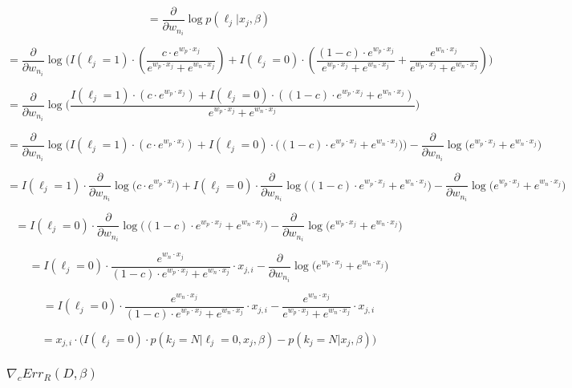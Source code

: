 \documentclass[]{article}
\begin{document}
$$
 = \frac{\partial}{\partial w_{n_i}}\log{p(\ell_j | x_j, \beta)}
$$

$$
 = \frac{\partial}{\partial w_{n_i}}
		\log{\Bigg(
			I(\ell_j=1) \cdot \left( \frac{c \cdot e^{w_p \cdot x_j}}{e^{w_p \cdot x_j} + e^{w_n \cdot x_j}} \right) + 
			I(\ell_j=0) \cdot \left(\frac{(1 - c) \cdot e^{w_p \cdot x_j}}{e^{w_p \cdot x_j} + e^{w_n \cdot x_j}}  + \frac{e^{w_n \cdot x_j}}{e^{w_p \cdot x_j} + e^{w_n \cdot x_j}} \right)
		\Bigg)}
$$

$$
 = \frac{\partial}{\partial w_{n_i}}
		\log{\Bigg(
		    \frac{
			I(\ell_j=1) \cdot \left( c \cdot e^{w_p \cdot x_j} \right) + 
			I(\ell_j=0) \cdot \left( (1 - c) \cdot e^{w_p \cdot x_j}  + e^{w_n \cdot x_j} \right)
		     }{e^{w_p \cdot x_j} + e^{w_n \cdot x_j}}
		\Bigg)}
$$

$$
 = \frac{\partial}{\partial w_{n_i}}
		\log{\bigg(
			I(\ell_j=1) \cdot \left( c \cdot e^{w_p \cdot x_j} \right) + 
			I(\ell_j=0) \cdot \Big( (1 - c) \cdot e^{w_p \cdot x_j}  + e^{w_n \cdot x_j} \Big)
		\bigg)}
		- \frac{\partial}{\partial w_{n_i}}
		 \log{\bigg(
			e^{w_p \cdot x_j} + e^{w_n \cdot x_j}
		\bigg)}
$$


$$
 = I(\ell_j=1) \cdot \frac{\partial}{\partial w_{n_i}}
		\log{\Big(
			c \cdot e^{w_p \cdot x_j}
		\Big)} +
    I(\ell_j=0) \cdot \frac{\partial}{\partial w_{n_i}}
		\log{ \Big( (1 - c) \cdot e^{w_p \cdot x_j}  + e^{w_n \cdot x_j} \Big) }
		- \frac{\partial}{\partial w_{n_i}}
		 \log{\bigg(
			e^{w_p \cdot x_j} + e^{w_n \cdot x_j}
		\bigg)}
$$

$$
 = I(\ell_j=0) \cdot \frac{\partial}{\partial w_{n_i}}
		\log{ \Big( (1 - c) \cdot e^{w_p \cdot x_j}  + e^{w_n \cdot x_j} \Big) }
		- \frac{\partial}{\partial w_{n_i}}
		 \log{\bigg(
			e^{w_p \cdot x_j} + e^{w_n \cdot x_j}
		\bigg)}
$$

$$
 = 	I(\ell_j=0) \cdot 
 		\frac{
			e^{w_n \cdot x_j}
		}{
			(1 - c) \cdot e^{w_p \cdot x_j}  + e^{w_n \cdot x_j}
		} \cdot x_{j,i}
		- \frac{\partial}{\partial w_{n_i}}
		 \log{\Big(
			e^{w_p \cdot x_j} + e^{w_n \cdot x_j}
		\Big)}
$$


$$
 = I(\ell_j=0) \cdot 
 		\frac{
			e^{w_n \cdot x_j}
		}{
			(1 - c) \cdot e^{w_p \cdot x_j}  + e^{w_n \cdot x_j}
		} \cdot x_{j,i}
		- 
 		\frac{
			e^{w_n \cdot x_j}
		}{
			e^{w_p \cdot x_j}  + e^{w_n \cdot x_j}
		} \cdot x_{j,i}
$$

$$
 = x_{j,i} \cdot
    \Big(	I(\ell_j=0) \cdot p(k_j=N | \ell_j=0, x_j, \beta) - 
		p(k_j=N | x_j, \beta)
    \Big)
$$

\subsubsection{$ \nabla_{c}{Err_R (D, \beta)}$}
\end{document}
